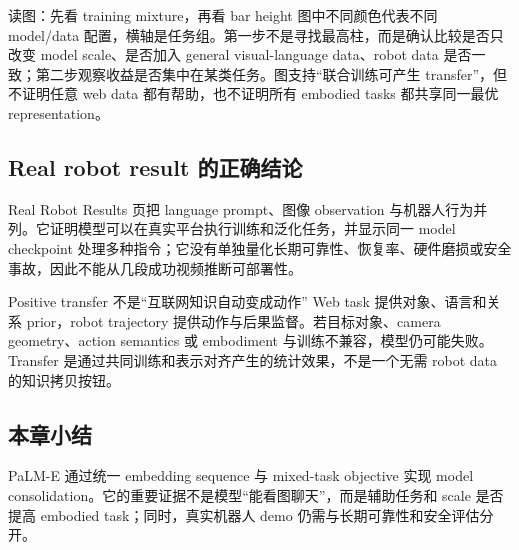 

\begin{knowledgebox}{读图：先看 training mixture，再看 bar height}
图中不同颜色代表不同 model/data 配置，横轴是任务组。第一步不是寻找最高柱，而是确认比较是否只改变 model scale、是否加入 general visual-language data、robot data 是否一致；第二步观察收益是否集中在某类任务。图支持“联合训练可产生 transfer”，但不证明任意 web data 都有帮助，也不证明所有 embodied tasks 都共享同一最优 representation。
\end{knowledgebox}

\subsection{Real robot result 的正确结论}

Real Robot Results 页把 language prompt、图像 observation 与机器人行为并列。它证明模型可以在真实平台执行训练和泛化任务，并显示同一 model checkpoint 处理多种指令；它没有单独量化长期可靠性、恢复率、硬件磨损或安全事故，因此不能从几段成功视频推断可部署性。


\begin{warningbox}{Positive transfer 不是“互联网知识自动变成动作”}
Web task 提供对象、语言和关系 prior，robot trajectory 提供动作与后果监督。若目标对象、camera geometry、action semantics 或 embodiment 与训练不兼容，模型仍可能失败。Transfer 是通过共同训练和表示对齐产生的统计效果，不是一个无需 robot data 的知识拷贝按钮。
\end{warningbox}

\subsection{本章小结}

PaLM-E 通过统一 embedding sequence 与 mixed-task objective 实现 model consolidation。它的重要证据不是模型“能看图聊天”，而是辅助任务和 scale 是否提高 embodied task；同时，真实机器人 demo 仍需与长期可靠性和安全评估分开。

